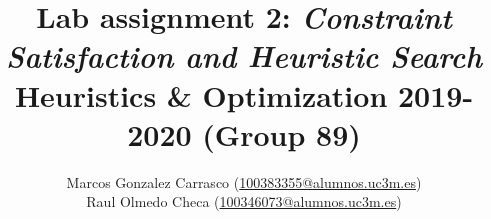 \documentclass[a4paper,usenames,dvipsnames,table]{report}
\begin{document}
\title{
    {\Huge \textbf{Lab assignment 2: \textit{Constraint Satisfaction and Heuristic Search}\\}}
    {\small Heuristics \& Optimization 2019-2020 (Group 89)}
}
\author{
    Marcos Gonzalez Carrasco ({\normalsize \href{mailto:100383355@alumnos.uc3m.es}{100383355@alumnos.uc3m.es}})\\
    Raul Olmedo Checa ({\normalsize \href{mailto:100346073@alumnos.uc3m.es}{100346073@alumnos.uc3m.es}})\\
}
\maketitle




\tableofcontents





\newpage
\end{document}

